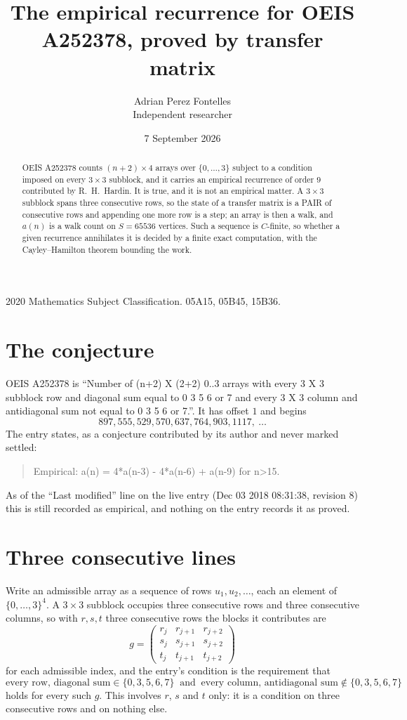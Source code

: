 \documentclass[11pt,a4paper]{article}
\title{The empirical recurrence for OEIS A252378, proved by transfer matrix}
\author{Adrian Perez Fontelles\\ \small Independent researcher}
\date{7 September 2026}
\theoremstyle{plain}
\theoremstyle{definition}
\begin{document}
\maketitle

\begin{abstract}
OEIS A252378 counts $(n+2)\times4$ arrays over $\{0,\dots,3\}$ subject to a condition imposed on
every $3\times3$ subblock, and it carries an empirical recurrence of order $9$
contributed by R.~H.~Hardin. It is true, and it is not an empirical matter. A $3\times3$
subblock spans three consecutive rows, so the state of a transfer matrix is a PAIR of
consecutive rows and appending one more row is a step; an array is then a walk, and
$a(n)$ is a walk count on $S=65536$ vertices. Such a sequence is $C$-finite, so whether a given
recurrence annihilates it is decided by a finite exact computation, with the Cayley--Hamilton
theorem bounding the work.
\end{abstract}

\noindent\small 2020 Mathematics Subject Classification. 05A15, 05B45, 15B36.\normalsize

\section{The conjecture}

OEIS A252378 is ``Number of (n+2) X (2+2) 0..3 arrays with every 3 X 3 subblock row and diagonal sum equal to 0 3 5 6 or 7 and every 3 X 3 column and antidiagonal sum not equal to 0 3 5 6 or 7.''. It has offset $1$ and begins
\[
897, 555, 529, 570, 637, 764, 903, 1117,\ \dots
\]
The entry states, as a conjecture contributed by its author and never marked settled:
\begin{quote}
Empirical: a(n) = 4*a(n-3) - 4*a(n-6) + a(n-9) for n>15.
\end{quote}
As of the ``Last modified'' line on the live entry (Dec 03 2018 08:31:38, revision 8) this is still
recorded as empirical, and nothing on the entry records it as proved.

\section{Three consecutive lines}

Write an admissible array as a sequence of rows $u_1,u_2,\dots$, each an element of
$\{0,\dots,3\}^{4}$. A $3\times3$ subblock occupies three consecutive rows and
three consecutive columns, so with $r,s,t$ three consecutive rows the blocks it
contributes are
\[
g=\begin{pmatrix}r_j&r_{j+1}&r_{j+2}\\ s_j&s_{j+1}&s_{j+2}\\ t_j&t_{j+1}&t_{j+2}\end{pmatrix}
\]
for each admissible index, and the entry's condition is the requirement that
\[
\text{every row, diagonal sum} \in \{0,3,5,6,7\}\ \text{ and }\ \text{every column, antidiagonal sum} \notin \{0,3,5,6,7\}
\]
holds for every such $g$. This involves $r$, $s$ and $t$ only: it is a condition on
three consecutive rows and on nothing else.
\end{document}
